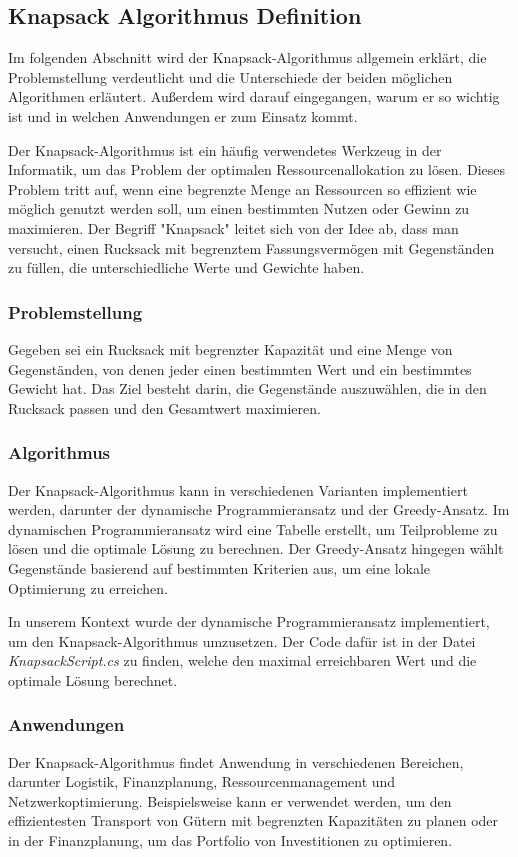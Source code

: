 
\subsection{Knapsack Algorithmus Definition}
Im folgenden Abschnitt wird der Knapsack-Algorithmus allgemein erklärt, die Problemstellung verdeutlicht und die
Unterschiede der beiden möglichen Algorithmen erläutert. Außerdem wird darauf eingegangen, warum er so wichtig ist
und in welchen Anwendungen er zum Einsatz kommt.

Der Knapsack-Algorithmus ist ein häufig verwendetes Werkzeug in der Informatik, um das Problem der optimalen
Ressourcenallokation zu lösen. Dieses Problem tritt auf, wenn eine begrenzte Menge an Ressourcen so effizient wie
möglich genutzt werden soll, um einen bestimmten Nutzen oder Gewinn zu maximieren. Der Begriff "Knapsack" leitet sich
von der Idee ab, dass man versucht, einen Rucksack mit begrenztem Fassungsvermögen mit Gegenständen zu füllen, die
unterschiedliche Werte und Gewichte haben.

\subsubsection{Problemstellung}
Gegeben sei ein Rucksack mit begrenzter Kapazität und eine Menge von Gegenständen, von denen jeder einen bestimmten
Wert und ein bestimmtes Gewicht hat. Das Ziel besteht darin, die Gegenstände auszuwählen, die in den Rucksack passen
und den Gesamtwert maximieren.

\subsubsection{Algorithmus}
Der Knapsack-Algorithmus kann in verschiedenen Varianten implementiert werden, darunter der dynamische
Programmieransatz und der Greedy-Ansatz. Im dynamischen Programmieransatz wird eine Tabelle erstellt, um
Teilprobleme zu lösen und die optimale Lösung zu berechnen. Der Greedy-Ansatz hingegen wählt Gegenstände basierend
auf bestimmten Kriterien aus, um eine lokale Optimierung zu erreichen.

In unserem Kontext wurde der dynamische Programmieransatz implementiert, um den Knapsack-Algorithmus umzusetzen.
Der Code dafür ist in der Datei \textit{KnapsackScript.cs} zu finden, welche den maximal erreichbaren Wert und
die optimale Lösung berechnet.

\subsubsection{Anwendungen}
Der Knapsack-Algorithmus findet Anwendung in verschiedenen Bereichen, darunter Logistik, Finanzplanung,
Ressourcenmanagement und Netzwerkoptimierung. Beispielsweise kann er verwendet werden, um den effizientesten
Transport von Gütern mit begrenzten Kapazitäten zu planen oder in der Finanzplanung, um das Portfolio von
Investitionen zu optimieren.

